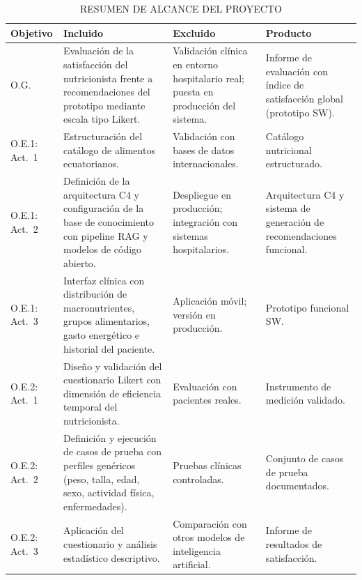 \begin{table}[h]
\centering
\caption{RESUMEN DE ALCANCE DEL PROYECTO}
\label{tab:alcance}
\begin{tabular}{|p{1.8cm}|p{3.8cm}|p{3.5cm}|p{3.5cm}|}
\hline
\textbf{Objetivo} & \textbf{Incluido} & \textbf{Excluido}
& \textbf{Producto} \\ \hline

O.G.
& Evaluación de la satisfacción del nutricionista frente a
recomendaciones del prototipo mediante escala tipo Likert.
& Validación clínica en entorno hospitalario real; puesta en
producción del sistema.
& Informe de evaluación con índice de satisfacción global
(prototipo SW). \\ \hline

O.E.1: Act.~1
& Estructuración del catálogo de alimentos ecuatorianos.
& Validación con bases de datos internacionales.
& Catálogo nutricional estructurado. \\ \hline

O.E.1: Act.~2
& Definición de la arquitectura C4 y configuración de la base de
conocimiento con pipeline RAG y modelos de código abierto.
& Despliegue en producción; integración con sistemas hospitalarios.
& Arquitectura C4 y sistema de generación de recomendaciones funcional. \\ \hline

O.E.1: Act.~3
& Interfaz clínica con distribución de macronutrientes, grupos
alimentarios, gasto energético e historial del paciente.
& Aplicación móvil; versión en producción.
& Prototipo funcional SW. \\ \hline

O.E.2: Act.~1
& Diseño y validación del cuestionario Likert con dimensión de
eficiencia temporal del nutricionista.
& Evaluación con pacientes reales.
& Instrumento de medición validado. \\ \hline

O.E.2: Act.~2
& Definición y ejecución de casos de prueba con perfiles genéricos
(peso, talla, edad, sexo, actividad física, enfermedades).
& Pruebas clínicas controladas.
& Conjunto de casos de prueba documentados. \\ \hline

O.E.2: Act.~3
& Aplicación del cuestionario y análisis estadístico descriptivo.
& Comparación con otros modelos de inteligencia artificial.
& Informe de resultados de satisfacción. \\ \hline

\end{tabular}
\end{table}
